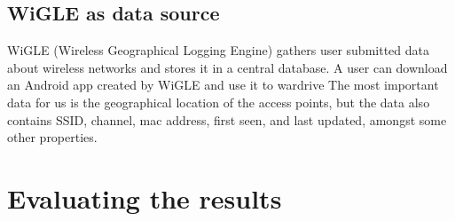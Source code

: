 \documentclass[a4paper,UKenglish]{report}
\begin{document}
\subsection{WiGLE as data source}
WiGLE (Wireless Geographical Logging Engine) gathers user submitted data about
wireless networks and stores it in a central database. A user can download an 
Android app created by WiGLE and use it to  wardrive The most important
data for us is the geographical location of the access points, but the data
also contains SSID, channel, mac address, first seen, and last updated, amongst
some other properties. 

\section{Evaluating the results} 




%



\printbibliography
\end{document}
